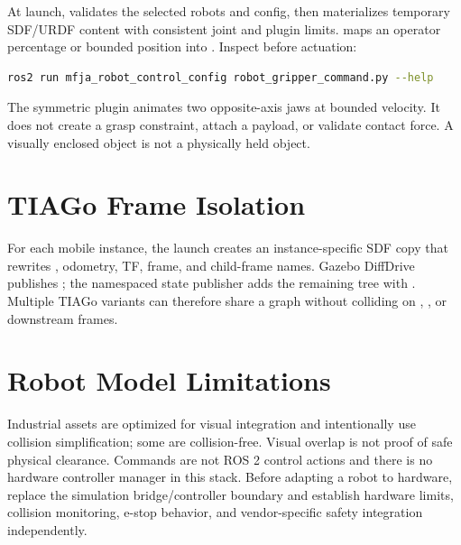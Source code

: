 At launch,  validates the selected robots and
config, then materializes temporary SDF/URDF content with consistent joint and
plugin limits.  maps an operator percentage or
bounded position into . Inspect before
actuation:

\begin{lstlisting}[language=bash]
ros2 run mfja_robot_control_config robot_gripper_command.py --help
\end{lstlisting}

\begin{safetybox}
The symmetric plugin animates two opposite-axis jaws at bounded velocity. It
does not create a grasp constraint, attach a payload, or validate contact force.
A visually enclosed object is not a physically held object.
\end{safetybox}

\section{TIAGo Frame Isolation}

For each mobile instance, the launch creates an instance-specific SDF copy that
rewrites , odometry, TF, frame, and child-frame names. Gazebo
DiffDrive publishes ; the namespaced state
publisher adds the remaining tree with . Multiple
TIAGo variants can therefore share a graph without colliding on
, , or downstream frames.

\section{Robot Model Limitations}

Industrial assets are optimized for visual integration and intentionally use
collision simplification; some are collision-free. Visual overlap is not proof
of safe physical clearance. Commands are not ROS 2 control actions and there is
no hardware controller manager in this stack. Before adapting a robot to
hardware, replace the simulation bridge/controller boundary and establish
hardware limits, collision monitoring, e-stop behavior, and vendor-specific
safety integration independently.
